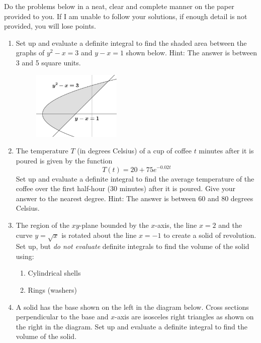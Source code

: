 \documentclass[12pt,letterpaper,fleqn]{article}
\theoremstyle{definition}
\begin{document}
Do the problems below in a neat, clear and complete manner on the paper provided to you. If I am unable to follow your solutions, if enough detail is not provided, you will lose points.
\begin{enumerate}
 \item Set up and evaluate a definite integral to find the shaded area between the graphs of $y^2 - x = 3$ and $y - x = 1$ shown below. Hint: The answer is between 3 and 5 square units.
       \begin{figure}[!htb]
        \centering
        \includegraphics[width=0.4\textwidth]{img/area_between_graphs.png}
       \end{figure}
 \item The temperature $T$ (in degrees Celsius) of a cup of coffee $t$ minutes after it is poured is given by the function
       \begin{equation*}
        T(t) = 20 + 75e^{-0.02t}
       \end{equation*}
       Set up and evaluate a definite integral to find the average temperature of the coffee over the first half-hour (30 minutes) after it is poured. Give your answer to the nearest degree. Hint: The answer is between 60 and 80 degrees Celsius.
 \item The region of the $xy$-plane bounded by the $x$-axis, the line $x = 2$ and the curve $y = \sqrt{x}$ is rotated about the line $x = -1$ to create a solid of revolution. Set up, but \emph{do not evaluate} definite integrals to find the volume of the solid using:
       \begin{enumerate}
        \item Cylindrical shells
        \item Rings (washers)
       \end{enumerate}
 \item A solid has the base shown on the left in the diagram below. Cross sections perpendicular to the base and $x$-axis are isosceles right triangles as shown on the right in the diagram. Set up and evaluate a definite integral to find the volume of the solid.

\end{enumerate}
\end{document}

